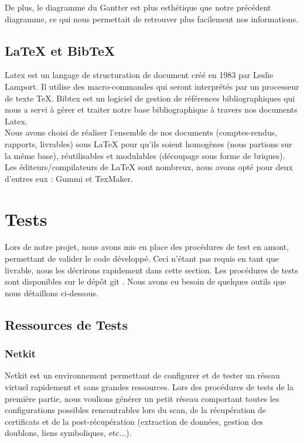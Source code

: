 De plus, le diagramme du Gantter est plus esthétique que notre précédent diagramme, ce qui nous permettait de retrouver plus facilement nos informations.


\subsection{LaTeX et BibTeX}

Latex est un langage de structuration de document créé en 1983 par Leslie Lamport. Il utilise des macro-commandes qui seront interprétés par un processeur de texte TeX. Bibtex est un logiciel de gestion de références bibliographiques qui nous a servi à gérer et traiter notre base bibliographique à travers nos documents Latex.\\

Nous avons choisi de réaliser l'ensemble de nos documents (comptes-rendus, rapports, livrables) sous LaTeX pour qu'ils soient homogènes (nous partions sur la même base), réutilisables et modulables (découpage sous forme de briques).\\


Les éditeurs/compilateurs de LaTeX sont nombreux, nous avons opté pour deux d'entres eux : Gummi et TexMaker.



\section{Tests}

Lors de notre projet, nous avons mis en place des procédures de test en amont, permettant de valider le code développé. Ceci n'étant pas requis en tant que livrable, nous les décrirons rapidement dans cette section. Les procédures de tests sont disponibles sur le dépôt git \cite{notregit}. Nous avons eu besoin de quelques outils que nous détaillons ci-dessous. 

\subsection{Ressources de Tests}
\subsubsection{Netkit}

Netkit est un environnement permettant de configurer et de tester un réseau virtuel rapidement et sans grandes ressources. Lors des procédures de tests de la première partie, nous voulions générer un petit réseau comportant toutes les configurations possibles rencontrables lors du scan, de la récupération de certificats et de la post-récupération (extraction de données, gestion des doublons, liens symboliques, etc...).\\

